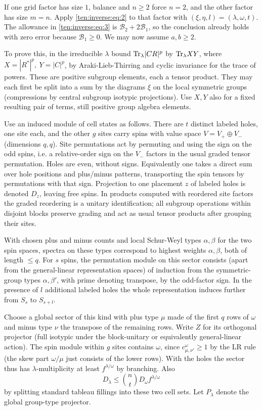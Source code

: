 If one grid factor has size \(1\), balance and \(n\ge2\) force \(n=2\),
and the other factor has size \(m=n\). Apply \eqref{ten:inverse:eq:2}
to that factor with \((\xi,\eta,l)=(\lambda,\omega,t)\). The allowance
in \eqref{ten:inverse:eq:3} is \(\mathcal B_2+2\mathcal B_1\), so the
conclusion already holds with zero error because \(\mathcal B_1\ge0\).
We may now assume \(a,b\ge2\).

To prove this, in the irreducible \(\lambda\) bound \({\rm Tr}_\lambda|CR|^p\) by \({\rm Tr}_\lambda XY\), where \(X=|R^*|^p,\ Y=|C|^p\), by Araki-Lieb-Thirring and cyclic invariance for the trace of powers. These are positive subgroup elements, each a tensor product. They may each first be split into a sum by the diagrams \(\xi\) on the local symmetric groups (compressions by central subgroup isotypic projections). Use \(X,Y\) also for a fixed resulting pair of terms, still positive group algebra elements.

Use an induced module of cell states as follows. There are \(t\) distinct labeled holes, one site each, and the other \(g\) sites carry spins with value space \(V=V_+\oplus V_-\) (dimensions \(q,q\)). Site permutations act by permuting and using the sign on the odd spins, i.e. a relative-order sign on the \(V_-\) factors in the usual graded tensor permutation. Holes are even, without signs. Equivalently one takes a direct sum over hole positions and plus/minus patterns, transporting the spin tensors by permutations with that sign. Projection to one placement \(z\) of labeled holes is denoted \(D_z\), leaving free spins. In products computed with reordered site factors the graded reordering is a unitary identification; all subgroup operations within disjoint blocks preserve grading and act as usual tensor products after grouping their sites.

With chosen plus and minus counts and local Schur-Weyl types \(\alpha,\beta\) for the two spin spaces, spectra on these types correspond to highest weights \(\alpha,\beta\), both of length \(\le q\). For \(s\) spins, the permutation module on this sector consists (apart from the general-linear representation spaces) of induction from the symmetric-group types \(\alpha,\beta'\), with prime denoting transpose, by the odd-factor sign. In the presence of \(l\) additional labeled holes the whole representation induces further from \(S_s\) to \(S_{s+l}\).

Choose a global sector of this kind with plus type \(\mu\) made of the first \(q\) rows of \(\omega\) and minus type \(\nu\) the transpose of the remaining rows. Write \(Z\) for its orthogonal projector (full isotypic under the block-unitary or equivalently general-linear action). The spin module within \(g\) sites contains \(\omega\), since \(c_{\mu,\nu'}^\omega\ge1\) by the LR rule (the skew part \(\omega/\mu\) just consists of the lower rows). With the holes the sector thus has \(\lambda\)-multiplicity at least \(f^{\lambda/\omega}\) by branching. Also
\[
 D_\lambda\le \binom nt D_\omega f^{\lambda/\omega}
\]
by splitting standard tableau fillings into these two cell sets. Let \(P_\lambda\) denote the global group-type projector.

